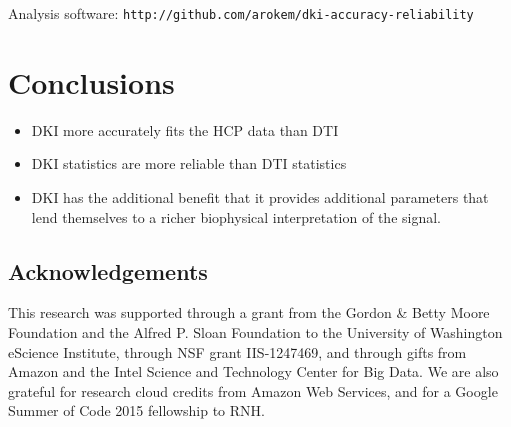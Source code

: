 \documentclass[a0, landscape]{a0poster}
\begin{document}
\begin{multicols}{3}
\noindent Analysis software: \texttt{http://github.com/arokem/dki-accuracy-reliability}


\color{SaddleBrown} %

\section*{Conclusions}
\large
\begin{itemize}

\item DKI more accurately fits the HCP data than DTI

\item DKI statistics are more reliable than DTI statistics

\item DKI has the additional benefit that it provides additional parameters that
lend themselves to a richer biophysical interpretation of the signal.

\end{itemize}

\color{DarkSlateGray} %


\nocite{*} %
\footnotesize  %

\subsection*{Acknowledgements} \footnotesize This research was supported through
a grant from the Gordon \& Betty Moore Foundation and the Alfred P. Sloan
Foundation to the University of Washington eScience Institute, through NSF grant
IIS-1247469, and through gifts from Amazon and the Intel Science and Technology
Center for Big Data. We are also grateful for research cloud credits from Amazon
Web Services, and for a Google Summer of Code 2015 fellowship to RNH.


\end{multicols}
\end{document}
